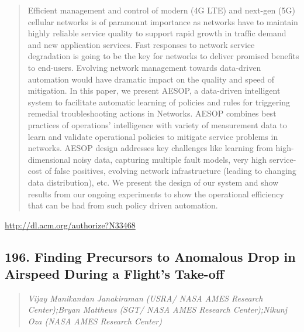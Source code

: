 \documentclass{article}
\begin{document}
\begin{quote}
Efficient management and control of modern (4G LTE) and next-gen (5G) cellular networks is of paramount importance as networks have to maintain highly reliable service quality to support rapid growth in traffic demand and new application services. Fast responses to network service degradation is going to be the key for networks to deliver promised benefits to end-users. Evolving network management towards data-driven automation would have dramatic impact on the quality and speed of mitigation. In this paper, we present AESOP, a data-driven intelligent system to facilitate automatic learning of policies and rules for triggering remedial troubleshooting actions in Networks. AESOP combines best practices of operations’ intelligence with variety of measurement data to learn and validate operational policies to mitigate service problems in networks. AESOP design addresses key challenges like learning from high-dimensional noisy data, capturing multiple fault models, very high service-cost of false positives, evolving network infrastructure (leading to changing data distribution), etc. We present the design of our system and show results from our ongoing experiments to show the operational efficiency that can be had from such policy driven automation.
\end{quote}

\href{http://dl.acm.org/authorize?N33468}{http://dl.acm.org/authorize?N33468}

\subsection{196. Finding Precursors to Anomalous Drop in Airspeed During a Flight's Take-off}

\begin{quote}
\footnotesize{\textit{Vijay Manikandan Janakiraman (USRA/ NASA AMES Research Center);Bryan Matthews (SGT/ NASA AMES Research Center);Nikunj Oza (NASA AMES Research Center)}}

\end{quote}
\end{document}
